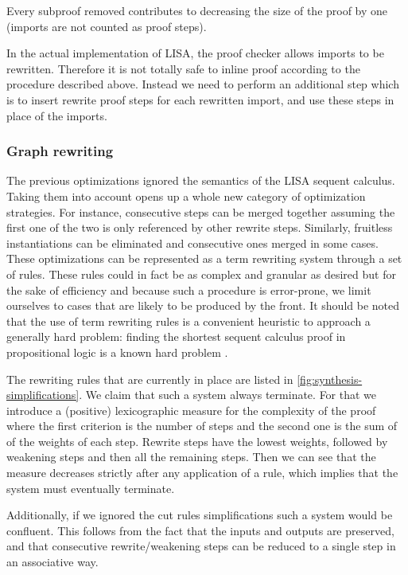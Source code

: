 Every subproof removed contributes to decreasing the size of the proof by one (imports are not counted as proof steps).

In the actual implementation of LISA, the proof checker allows imports to be rewritten. Therefore it is not totally safe to inline proof according to the procedure described above. Instead we need to perform an additional step which is to insert rewrite proof steps for each rewritten import, and use these steps in place of the imports.

\subsubsection{Graph rewriting}

The previous optimizations ignored the semantics of the LISA sequent calculus. Taking them into account opens up a whole new category of optimization strategies.
For instance, consecutive  steps can be merged together assuming the first one of the two is only referenced by other rewrite steps. Similarly, fruitless instantiations can be eliminated and consecutive ones merged in some cases. These optimizations can be represented as a term rewriting system through a set of rules. These rules could in fact be as complex and granular as desired but for the sake of efficiency and because such a procedure is error-prone, we limit ourselves to cases that are likely to be produced by the front. It should be noted that the use of term rewriting rules is a convenient heuristic to approach a generally hard problem: finding the shortest sequent calculus proof in propositional logic is a known hard problem \cite{Krajicek1994}.

The rewriting rules that are currently in place are listed in \autoref{fig:synthesis-simplifications}. We claim that such a system always terminate. For that we introduce a (positive) lexicographic measure for the complexity of the proof where the first criterion is the number of steps and the second one is the sum of of the weights of each step. Rewrite steps have the lowest weights, followed by weakening steps and then all the remaining steps. Then we can see that the measure decreases strictly after any application of a rule, which implies that the system must eventually terminate.

Additionally, if we ignored the cut rules simplifications such a system would be confluent. This follows from the fact that the inputs and outputs are preserved, and that consecutive rewrite/weakening steps can be reduced to a single step in an associative way.


